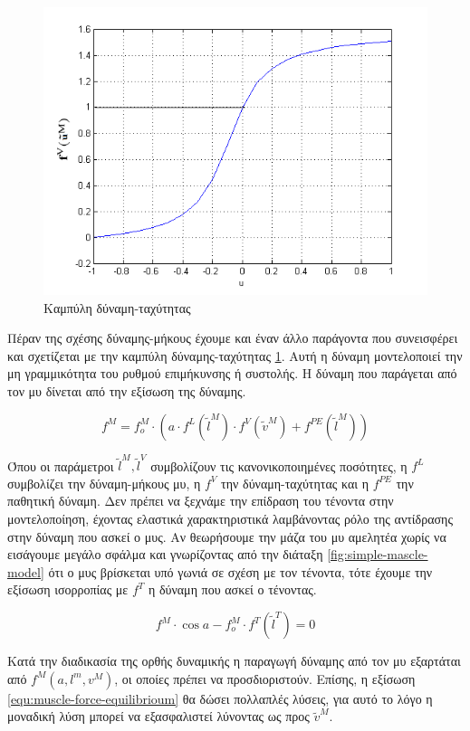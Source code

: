 \begin{figure}[H]
    \centering
    \includegraphics[width=.6\textwidth]{neuromusculoskeletal/fig/force-velocity.png}
    \caption{Καμπύλη δύναμη-ταχύτητας}
    \label{fig:force-velocity}
\end{figure}

Πέραν της σχέσης δύναμης-μήκους έχουμε και έναν άλλο παράγοντα που συνεισφέρει και σχετίζεται με την καμπύλη δύναμης-ταχύτητας \ref{fig:force-velocity}. Αυτή η δύναμη μοντελοποιεί την μη γραμμικότητα του ρυθμού επιμήκυνσης ή συστολής. Η δύναμη που παράγεται από τον μυ δίνεται από την εξίσωση της δύναμης.

\begin{equation}
    f^{M} = f^{M}_{o} \cdot (a \cdot f^{L}(\tilde{l}^{M}) \cdot f^{V}(\tilde{v}^{M}) + f^{PE}(\tilde{l}^{M}))
    \label{equ:muscle-force}
\end{equation}

Όπου οι παράμετροι $\tilde{l}^{M}, \tilde{l}^{V}$ συμβολίζουν τις κανονικοποιημένες ποσότητες, η $f^{L}$ συμβολίζει την δύναμη-μήκους μυ, η $f^{V}$ την δύναμη-ταχύτητας και η $f^{PE}$ την παθητική δύναμη. Δεν πρέπει να ξεχνάμε την επίδραση του τένοντα στην μοντελοποίηση, έχοντας ελαστικά χαρακτηριστικά λαμβάνοντας ρόλο της αντίδρασης στην δύναμη που ασκεί ο μυς. Αν θεωρήσουμε την μάζα του μυ αμελητέα χωρίς να εισάγουμε μεγάλο σφάλμα και γνωρίζοντας από την διάταξη \ref{fig:simple-mascle-model} ότι ο μυς βρίσκεται υπό γωνιά  σε σχέση με τον τένοντα, τότε έχουμε την εξίσωση ισορροπίας με $f^{T}$ η δύναμη που ασκεί ο τένοντας.

\begin{equation}
    f^{M} \cdot \cos{a} - f^{M}_{o} \cdot f^{T}(\tilde{l}^{T}) = 0
    \label{equ:muscle-force-equilibrioum}
\end{equation}

Κατά την διαδικασία της ορθής δυναμικής η παραγωγή δύναμης από τον μυ εξαρτάται από $f^{M}(a, l^{m}, v^{M})$, οι οποίες πρέπει να προσδιοριστούν. Επίσης, η εξίσωση \ref{equ:muscle-force-equilibrioum} θα δώσει πολλαπλές λύσεις, για αυτό το λόγο η μοναδική λύση μπορεί να εξασφαλιστεί λύνοντας ως προς $\tilde{v}^{M}$.

